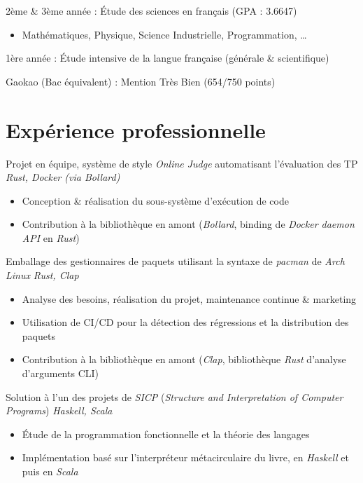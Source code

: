 \documentclass{resume}
\begin{document}
2ème \& 3ème année : Étude des sciences en français (GPA : 3.6647)
\begin{itemize}
  \item Mathématiques, Physique, Science Industrielle, Programmation, …
\end{itemize}
1ère année : Étude intensive de la langue française (générale \& scientifique)

Gaokao (Bac équivalent) : Mention Très Bien (654/750 points)


\section{Expérience professionnelle}
Projet en équipe, système de style \textit{Online Judge} automatisant l'évaluation des TP \hfill \textit{Rust, Docker (via Bollard)}
\begin{itemize}
  \item Conception \& réalisation du sous-système d'exécution de code
  \item Contribution à la bibliothèque en amont (\textit{Bollard}, binding de \textit{Docker daemon API} en \textit{Rust})
\end{itemize}

Emballage des gestionnaires de paquets utilisant la syntaxe de \textit{pacman} de \textit{Arch Linux} \hfill \textit{Rust, Clap}
\begin{itemize}
  \item Analyse des besoins, réalisation du projet, maintenance continue \& marketing
  \item Utilisation de CI/CD pour la détection des régressions et la distribution des paquets
  \item Contribution à la bibliothèque en amont (\textit{Clap}, bibliothèque \textit{Rust} d'analyse d'arguments CLI)
\end{itemize}

Solution à l'un des projets de \textit{SICP} (\textit{Structure and Interpretation of Computer Programs}) \hfill \textit{Haskell, Scala}
\begin{itemize}
  \item Étude de la programmation fonctionnelle et la théorie des langages
  \item Implémentation basé sur l'interpréteur métacirculaire du livre, en \textit{Haskell} et puis en \textit{Scala}
\end{itemize}
\end{document}
